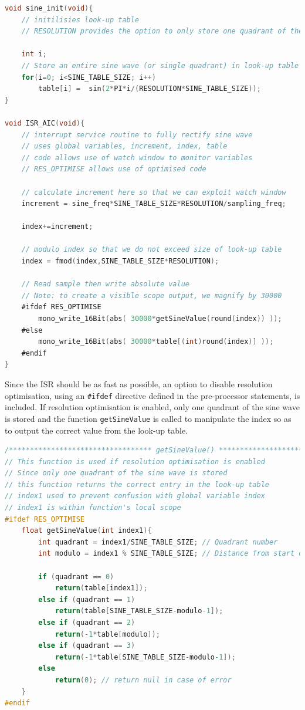 \documentclass{article}
\begin{document}
\begin{lstlisting}[language=C, frame = single, caption=Code to generate interrupt driven rectified sine wave (using a look-up table), label = lst:c-code]
void sine_init(void){
    // initilisies look-up table
    // RESOLUTION provides the option to only store one quadrant of the sine wave
    
    int i;
    // Store an entire sine wave (or single quadrant) in look-up table
    for(i=0; i<SINE_TABLE_SIZE; i++)
        table[i] =  sin(2*PI*i/(RESOLUTION*SINE_TABLE_SIZE));
}

void ISR_AIC(void){
    // interrupt service routine to fully rectify sine wave
    // uses global variables, increment, index, table
    // code allows use of watch window to monitor variables
    // RES_OPTIMISE allows use of optimised code
    
    // calculate increment here so that we can exploit watch window
    increment = sine_freq*SINE_TABLE_SIZE*RESOLUTION/sampling_freq;
    
    index+=increment;
    
    // modulo index so that we do not exceed size of look-up table	   
    index = fmod(index,SINE_TABLE_SIZE*RESOLUTION);
    
    // Read sample then write absolute value
    // Note: to create a visible scope output, we magnify by 30000
    #ifdef RES_OPTIMISE
        mono_write_16Bit(abs( 30000*getSineValue(round(index)) ));
    #else
        mono_write_16Bit(abs( 30000*table[(int)round(index)] ));
    #endif
}


\end{lstlisting}

Since the ISR should be as fast as possible, an option to disable resolution optimisation, using an {\tt \#ifdef} directive defined in the pre-processor statements, is included. If resolution optimisation is enabled, only one quadrant of the sine wave is stored and the function {\tt getSineValue} is called to manipulate the index so as to output the correct value from the look-up table. \\

\begin{lstlisting}[language=C, frame=single, caption=Optimised code]
/********************************** getSineValue() **********************************/
// This function is used if resolution optimisation is enabled
// Since only one quadrant of the sine wave is stored
// this function returns the correct entry in the look-up table
// index1 used to prevent confusion with global variable index
// index1 is within function's local scope
#ifdef RES_OPTIMISE
	float getSineValue(int index1){
	    int quadrant = index1/SINE_TABLE_SIZE; // Quadrant number
	    int modulo = index1 % SINE_TABLE_SIZE; // Distance from start of quadrant
	    
		if (quadrant == 0)
			return(table[index1]);
		else if (quadrant == 1)
			return(table[SINE_TABLE_SIZE-modulo-1]);
		else if (quadrant == 2)
			return(-1*table[modulo]);
		else if (quadrant == 3)
			return(-1*table[SINE_TABLE_SIZE-modulo-1]);	
		else
			return(0); // return null in case of error
	}
#endif
\end{lstlisting}
\end{document}
